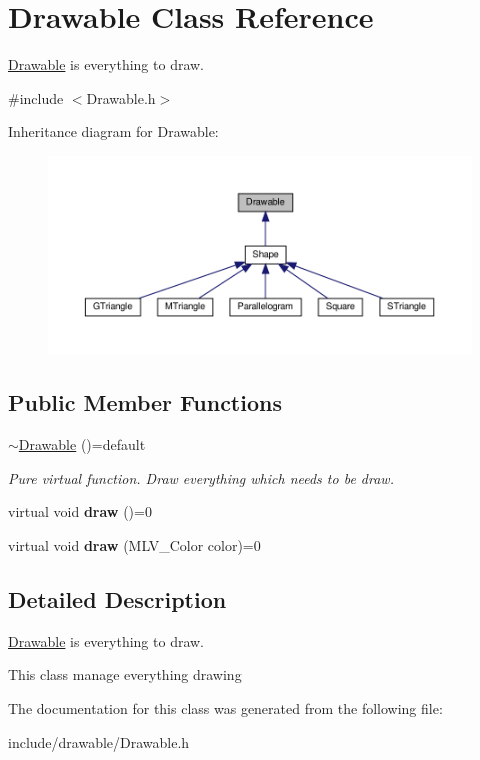 \hypertarget{classDrawable}{}\section{Drawable Class Reference}
\label{classDrawable}


\hyperlink{classDrawable}{Drawable} is everything to draw.  




{\ttfamily \#include $<$Drawable.\+h$>$}



Inheritance diagram for Drawable\+:\nopagebreak
\begin{figure}[H]
\begin{center}
\leavevmode
\includegraphics[width=350pt]{classDrawable__inherit__graph}
\end{center}
\end{figure}
\subsection*{Public Member Functions}
\begin{DoxyCompactItemize}
\item 
\mbox{\label{classDrawable_a313ec095ce0ea2a8c7cac78a6be27be8}} 
\hyperlink{classDrawable_a313ec095ce0ea2a8c7cac78a6be27be8}{$\sim$\+Drawable} ()=default
\begin{DoxyCompactList}\small\item\em Pure virtual function. Draw everything which needs to be draw. \end{DoxyCompactList}\item 
\mbox{\label{classDrawable_aa37d7b328240d343134adcfe5e4dcd38}} 
virtual void {\bfseries draw} ()=0
\item 
\mbox{\label{classDrawable_aa45b93aaf493419c15c240702aa9f692}} 
virtual void {\bfseries draw} (M\+L\+V\+\_\+\+Color color)=0
\end{DoxyCompactItemize}


\subsection{Detailed Description}
\hyperlink{classDrawable}{Drawable} is everything to draw. 

This class manage everything drawing 

The documentation for this class was generated from the following file\+:\begin{DoxyCompactItemize}
\item 
include/drawable/Drawable.\+h\end{DoxyCompactItemize}
